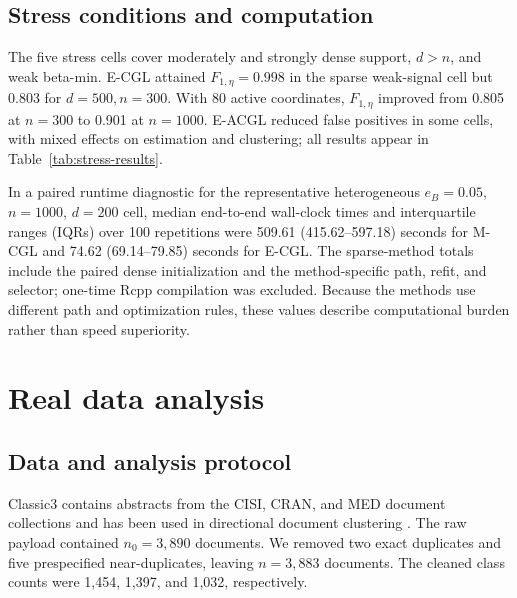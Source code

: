 \documentclass[preprint,12pt,authoryear]{elsarticle}
\begin{document}
\subsection{Stress conditions and computation}

The five stress cells cover moderately and strongly dense support, $d>n$, and
weak beta-min. E-CGL attained $F_{1,\eta}=0.998$ in the sparse weak-signal cell
but 0.803 for $d=500,n=300$. With 80 active coordinates, $F_{1,\eta}$ improved
from 0.805 at $n=300$ to 0.901 at $n=1000$. E-ACGL reduced false positives in
some cells, with mixed effects on estimation and clustering; all results
appear in Table~\ref{tab:stress-results}.



In a paired runtime diagnostic for the representative heterogeneous
$e_B=0.05$, $n=1000$, $d=200$ cell, median end-to-end wall-clock times and
interquartile ranges (IQRs) over 100 repetitions were 509.61
(415.62--597.18) seconds for M-CGL
and 74.62 (69.14--79.85) seconds for E-CGL. The sparse-method totals include the
paired dense initialization and the method-specific path, refit, and selector;
one-time Rcpp compilation was excluded. Because the methods use different path
and optimization rules, these values describe computational burden rather than
speed superiority.

\clearpage
\section{Real data analysis}

\subsection{Data and analysis protocol}

Classic3 contains abstracts from the CISI, CRAN, and MED document collections
and has been used in directional document clustering
\citep{banerjee2005vmf}. The raw payload contained
$n_0=3{,}890$ documents. We removed two exact duplicates and five prespecified
near-duplicates, leaving $n=3{,}883$ documents. The cleaned class counts were
1,454, 1,397, and 1,032, respectively.
\end{document}

